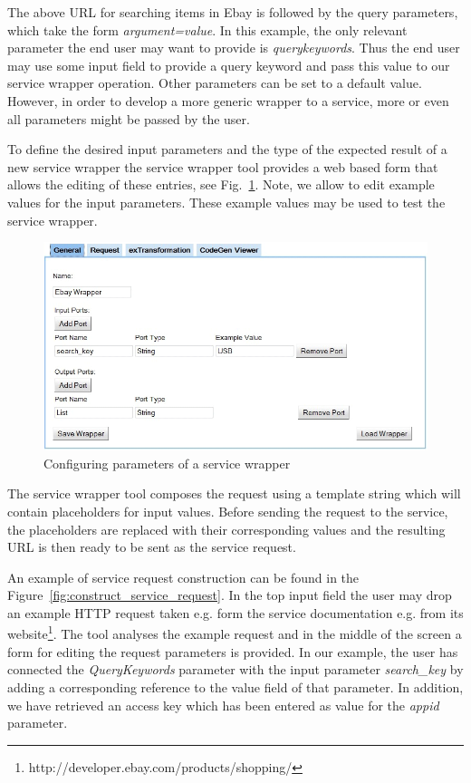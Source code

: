 The above URL for searching items in Ebay is followed by the query parameters, which take the form \textit{argument=value}. In this example, the only relevant parameter the end user may want to provide is \emph{querykeywords}. Thus the end user may use some input field to provide a query keyword and pass this value to our service wrapper operation. Other parameters can be set to a default value. However, in order to develop a more generic wrapper to a service, more or even all parameters might be passed by the user.

To define the desired input parameters and the type of the expected result of a new service wrapper the service wrapper tool provides a web based form that allows the editing of these entries, see Fig.~\ref{fig:construct_pre_post_conditions}. Note, we allow to edit example values for the input parameters. These example values may be used to test the service wrapper. 

\begin{figure}
  \begin{center} \includegraphics[width=\linewidth]{images/ServiceWrapperToolGVSWithPortDefinitions.png}
    \caption{Configuring parameters of a service wrapper}
    \label{fig:construct_pre_post_conditions}
  \end{center}
\end{figure}

The service wrapper tool composes the request using a template string which will contain placeholders for input values. Before sending the request to the service, the placeholders are replaced with their corresponding values and the resulting URL is then ready to be sent as the service request.

An example of service request construction can be found in the Figure~\ref{fig:construct_service_request}. In the top input field the user may drop an example HTTP request taken e.g. form the service documentation e.g. from its website\footnote{http://developer.ebay.com/products/shopping/}. The tool analyses the example request and in the middle of the screen a form for editing the request parameters is provided. In our example, the user has connected the \textit{QueryKeywords} parameter with the input parameter \textit{search\_key} by adding a corresponding reference to the value field of that parameter. In addition, we have retrieved an access key which has been entered as value for the \textit{appid} parameter.

